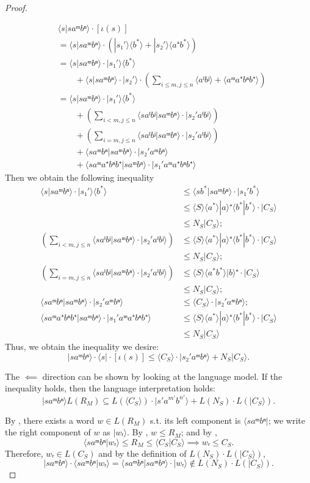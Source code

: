 \begin{proof}
\begin{itemize}
\begin{align*}
        & ⟨s|s aᵐ bⁿ⟩ ⋅ [ι(s)] \\
        & = ⟨s|s aᵐ bⁿ⟩ ⋅ (|s₁'⟩ ⟨b^*⟩ + |s₂'⟩ ⟨a⁺b^*⟩) \\[5px]
        & = ⟨s |s aᵐ bⁿ⟩ ⋅ |s₁'⟩ ⟨b^*⟩ \\
        & \qquad + ⟨s | s aᵐ bⁿ⟩ ⋅ |s₂'⟩ ⋅ 
            (∑_{i ≤ m, j ≤ n}⟨aⁱ bʲ⟩ + ⟨aᵐ a⁺ bⁿ b⁺⟩) \\[5px]
        & = ⟨s |s aᵐ bⁿ⟩ ⋅ |s₁'⟩ ⟨b^*⟩ \\
        & \qquad + (∑_{i < m, j ≤ n} ⟨s aⁱ bʲ| s aᵐ bⁿ⟩ ⋅ |s₂' aⁱ bʲ⟩) \\  
        & \qquad + (∑_{i = m, j ≤ n} ⟨s aⁱ bʲ| s aᵐ bⁿ⟩ ⋅ |s₂'aⁱ bʲ⟩) \\  
        & \qquad + ⟨s aᵐ bⁿ| s aᵐ bⁿ⟩ ⋅ |s₂'aᵐ bⁿ⟩ \\
        & \qquad + ⟨s aᵐ a⁺ bⁿ b⁺|s aᵐ bⁿ⟩ ⋅ |s₁' aᵐ a⁺ bⁿ b⁺⟩
      \end{align*}
      Then we obtain the following inequality
      \begin{align*}
        ⟨s |s aᵐ bⁿ⟩ ⋅ |s₁'⟩ ⟨b^*⟩ 
          & ≤ ⟨s b^* |s aᵐ bⁿ⟩ ⋅ |s₁' b^*⟩ \\
          & ≤ ⟨S⟩ ⟨a^*⟩ |a⟩⁺ ⟨b^* | b^*⟩ ⋅ |C_S⟩ \\  
          & ≤ N_S |C_S⟩; \\ 
        (∑_{i < m, j ≤ n} ⟨s aⁱ bʲ| s aᵐ bⁿ⟩ ⋅ |s₂' aⁱ bʲ⟩) 
          & ≤ ⟨S⟩ ⟨a^*⟩ |a⟩⁺ ⟨b^* | b^*⟩ ⋅ |C_S⟩ \\  
          & ≤ N_S |C_S⟩; \\
        (∑_{i = m, j ≤ n} ⟨s aⁱ bʲ| s aᵐ bⁿ⟩ ⋅ |s₂'aⁱ bʲ⟩)
          & ≤ ⟨S⟩ ⟨a^* b^*⟩ |b⟩⁺ ⋅ |C_S⟩\\  
          & ≤ N_S |C_S⟩; \\  
        ⟨s aᵐ bⁿ| s aᵐ bⁿ⟩ ⋅ |s₂'aᵐ bⁿ⟩ 
          & ≤ ⟨C_S⟩ ⋅ |s₂' aᵐ bⁿ⟩;  \\
        ⟨s aᵐ a⁺ bⁿ b⁺|s aᵐ bⁿ⟩ ⋅ |s₁' aᵐ a⁺ bⁿ b⁺⟩
          & ≤ ⟨S⟩ ⟨a^*⟩ |a⟩⁺ ⟨b^* | b^*⟩ ⋅ |C_S⟩ \\  
          & ≤ N_S |C_S⟩ 
        \end{align*}
      Thus, we obtain the inequality we desire:
      \[| s aᵐ bⁿ ⟩ ⋅ ⟨s| ⋅ [ι(s)] ≤ ⟨C_S⟩ ⋅ |s₂' aᵐ bⁿ⟩ + N_S |C_S⟩.\]
  \end{itemize}

  The \(⟸\) direction can be shown by looking at the language model.
  If the inequality holds, then the language interpretation holds:
  \[| s aᵐ bⁿ ⟩ L(R_M) ⊆ L(⟨C_S⟩) ⋅ |s' a^{m'} b^{n'}⟩ + L(N_S) ⋅ L(|C_{S}⟩).\]

  By ,
  there exists a word \(w ∈ L(R_M)\) s.t. its left component is \(⟨ s aᵐ bⁿ |\);
  we write the right component of \(w\) as \(|wᵣ⟩\).
  By , \(w ≤ R_M\); and
  by ,
  \[⟨ s aᵐ bⁿ | wᵣ⟩ ≤ R_M ≤ ⟨C_S|C_S⟩ ⟹ wᵣ ≤ C_S.\]
  Therefore, \(wᵣ ∈ L(C_S)\) and by the definition of \(L(N_S) ⋅ L(|C_{S}⟩)\),
  \[| s aᵐ bⁿ ⟩ ⋅ ⟨ s aᵐ bⁿ | wᵣ ⟩ = ⟨ s aᵐ bⁿ | s aᵐ bⁿ ⟩ ⋅ | wᵣ ⟩ ∉ L(N_S) ⋅ L(|C_{S}⟩).\]


\end{proof}
